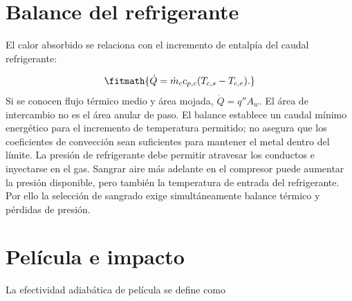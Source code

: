 \documentclass[10pt,openany]{book}
\begin{document}
\begin{minipage}{\linewidth}
{\begin{tikzpicture}
\end{tikzpicture}}%
\else
{}%
\fi
\fi
\endgroup
\par\nopagebreak
{}
\end{minipage}
\par\vspace{\baselineskip}

\section{Balance del refrigerante}

El calor absorbido se relaciona con el incremento de entalpía del caudal refrigerante:

\[
\fitmath{\dot Q=\dot m_c c_{p,c}(T_{c,s}-T_{c,e}).}
\]
Si se conocen flujo térmico medio y área mojada, \(\dot Q=q''A_w\). El área de intercambio no es el área anular de paso. El balance establece un caudal mínimo energético para el incremento de temperatura permitido; no asegura que los coeficientes de convección sean suficientes para mantener el metal dentro del límite.
La presión de refrigerante debe permitir atravesar los conductos e inyectarse en el gas. Sangrar aire más adelante en el compresor puede aumentar la presión disponible, pero también la temperatura de entrada del refrigerante. Por ello la selección de sangrado exige simultáneamente balance térmico y pérdidas de presión.

\section{Película e impacto}


La efectividad adiabática de película se define como
\end{document}

